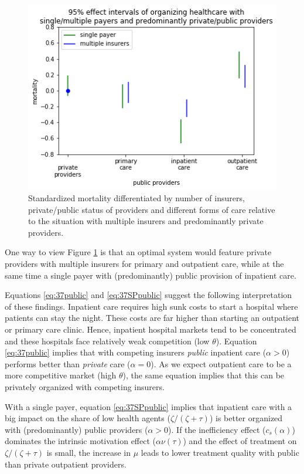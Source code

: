 \documentclass[a4paper,12pt]{article}
\begin{document}
\begin{figure}[htbp]
\centering
\includegraphics[width=.9\linewidth]{./figures/single_multiple_public_private.png}
\caption{\label{fig:public_private}Standardized mortality differentiated by number of insurers, private/public status of providers and different forms of care relative to the situation with multiple insurers and predominantly private providers.}
\end{figure}

One way to view Figure \ref{fig:public_private} is that an optimal system would feature private providers with multiple insurers for primary and outpatient care, while at  the same time a single payer with (predominantly) public provision of inpatient care.

Equations \eqref{eq:37public} and \eqref{eq:37SPpublic}  suggest the following interpretation of these findings. Inpatient care requires high sunk costs to start a hospital where patients can stay the night. These costs are far higher than starting an outpatient or primary care clinic. Hence, inpatient hospital markets tend to be concentrated and these hospitals face relatively weak competition (low \(\theta\)). Equation \eqref{eq:37public} implies that with competing insurers \emph{public} inpatient care (\(\alpha >0\)) performs better than \emph{private} care (\(\alpha=0\)). As we expect outpatient care to be a more competitive market (high \(\theta\)), the same equation implies that this can be privately organized with competing insurers.

With a single payer, equation \eqref{eq:37SPpublic} implies that inpatient care with a big impact on the share of low health agents (\(\zeta/(\zeta+\tau)\)) is better organized with (predominantly) public providers (\(\alpha>0\)). If the inefficiency effect (\(c_s(\alpha)\)) dominates the intrinsic motivation effect (\(\alpha \nu(\tau)\)) and the effect of treatment on \(\zeta/(\zeta+\tau)\) is small, the increase in \(\mu\) leads to lower treatment quality with public than private outpatient providers.
\end{document}

